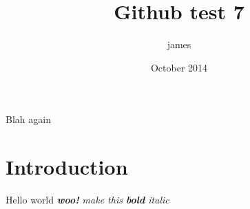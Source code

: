 \documentclass{article}
\title{Github test 7}
\author{james }
\date{October 2014}
\begin{document}
\maketitle

Blah again

\section{Introduction}

Hello world \textit{\textbf{woo!} make this \textbf{bold} \textit{italic}}
\end{document}
